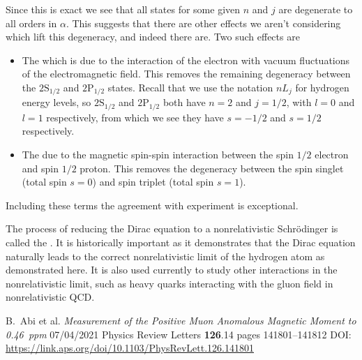 \documentclass[fleqn]{NotesClass}
\begin{document}
    Since this is exact we see that all states for some given \(n\) and \(j\) are degenerate to all orders in \(\alpha\).
    This suggests that there are other effects we aren't considering which lift this degeneracy, and indeed there are.
    Two such effects are
    \begin{itemize}
        \item The  which is due to the interaction of the electron with vacuum fluctuations of the electromagnetic field.
        This removes the remaining degeneracy between the \(2\mathrm{S}_{1/2}\) and \(2\mathrm{P}_{1/2}\) states.
        Recall that we use the notation \(nL_j\) for hydrogen energy levels, so \(2\mathrm{S}_{1/2}\) and \(2\mathrm{P}_{1/2}\) both have \(n = 2\) and \(j = 1/2\), with \(l = 0\) and \(l = 1\) respectively, from which we see they have \(s = -1/2\) and \(s = 1/2\) respectively.
        
        \item The  due to the magnetic spin-spin interaction between the spin \(1/2\) electron and spin \(1/2\) proton.
        This removes the degeneracy between the spin singlet (total spin \(s = 0\)) and spin triplet (total spin \(s = 1\)).
    \end{itemize}
    Including these terms the agreement with experiment is exceptional.
    
    The process of reducing the Dirac equation to a nonrelativistic Schr\"odinger is called the .
    It is historically important as it demonstrates that the Dirac equation naturally leads to the correct nonrelativistic limit of the hydrogen atom as demonstrated here.
    It is also used currently to study other interactions in the nonrelativistic limit, such as heavy quarks interacting with the gluon field in nonrelativistic QCD.
    
    \appendixpage
    \begin{appendices}
        
        
        
        
    \end{appendices}
    
    \backmatter
    \renewcommand{\glossaryname}{Acronyms}
    \printglossary[acronym]
    \printindex
    \begin{thebibliography}{9}
         B.~Abi et al. \textit{Measurement of the Positive Muon Anomalous Magnetic Moment to \qty{0.46}{ppm}} 07/04/2021 Physics Review Letters \textbf{126}.14 pages 141801--141812 DOI: \url{https://link.aps.org/doi/10.1103/PhysRevLett.126.141801}
    \end{thebibliography}
\end{document}
